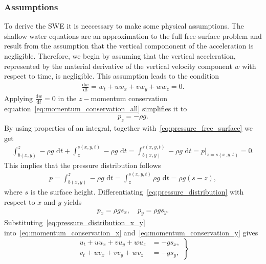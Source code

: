 \subsubsection*{Assumptions}
To derive the SWE it is neccessary to make some physical assumptions. 
The shallow water equations are an approximation to the full free-surface problem and result from the assumption that the vertical compononent of the acceleration is negligible.
Therefore, we begin by assuming that the vertical acceleration, represented by the material derivative of the vertical velocity component $w$ with respect to time, is negligible.
This assumption leads to the condition
\begin{align*}
    \frac{\text{d} w}{\text{d} t} = w_t + uw_x + vw_y + ww_z = 0.
\end{align*}
Applying $\frac{\text{d}w}{\text{d}t} = 0$ in the $z-$momentum conservation equation~\eqref{eq:momentum_conservation_all} simplifies it to
\begin{align*}
    p_z = -\rho g.
\end{align*}
By using properties of an integral, together with~\eqref{eq:pressure_free_surface} we get
\begin{align*}
    \int_{b(x,y)}^z - \rho g \text{ d}t + \int_z^{s(x,y,t)} - \rho g \text{ d}t = \int_{b(x,y)}^{s(x,y,t)} - \rho g \text{ d}t
    = p|_{z = s(x,y,t)} = 0.
\end{align*}
This implies that the pressure distribution follows
\begin{align}\label{eq:pressure_distribution}
    p = \int_{b(x,y)}^z - \rho g \text{ d}t = \int_z^{s(x,y,t)} \rho g \text{ d}t = \rho g (s - z),
\end{align}
where $s$ is the surface height.
Differentiating~\eqref{eq:pressure_distribution} with respect to $x$ and $y$ yields
\begin{align}\label{eq:pressure_distribution_x_y}
    p_x = \rho g s_x, \quad p_y = \rho g s_y.
\end{align}
Substituting~\eqref{eq:pressure_distribution_x_y} into~\eqref{eq:momentum_conservation_x} and~\eqref{eq:momentum_conservation_y} gives
\begin{equation}\label{eq:momentum_conservation_xy_simplified}
    \left.
    \begin{aligned}
        u_t + u u_x + v u_y + w u_z &= -g s_x,  \\
        v_t + u v_x + v v_y + w v_z &= -g s_y,
    \end{aligned}
    \right\}
\end{equation}
